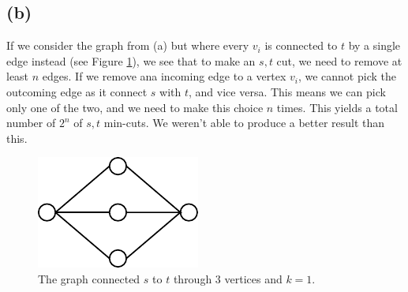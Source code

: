 \documentclass[a4paper]{article}
\begin{document}
\subsection*{(b)}
If we consider the graph from (a) but where every $v_i$ is connected to $t$ by a single edge instead (see Figure \ref{fig3}), we see that to make an $s,t$ cut, we need to remove at least $n$ edges. If we remove ana incoming edge to a vertex $v_i$, we cannot pick the outcoming edge as it connect $s$ with $t$, and vice versa. This means we can pick only one of the two, and we need to make this choice $n$ times. This yields a total number of $2^n$ of $s,t$ min-cuts. We weren't able to produce a better result than this.
\begin{figure}[H]
  \centering
  \includegraphics[scale=2]{fig3.pdf}
  \caption{The graph connected $s$ to $t$ through $3$ vertices and $k=1$.}
  \label{fig3}
\end{figure}
\end{document}
